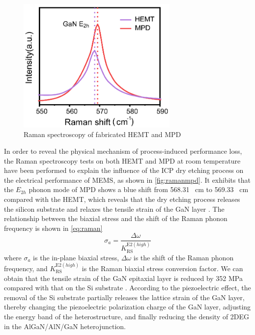 \begin{figure}[H] 
\centering    
\includegraphics[width=0.7\textwidth]{ramanmpd}
\caption[Raman spectroscopy of fabricated HEMT and MPD]{Raman spectroscopy of fabricated HEMT and MPD}
\label{fig:ramanmpd}
\end{figure}

In order to reveal the physical mechanism  of process-induced performance loss, the Raman spectroscopy tests on both HEMT  and MPD  at room temperature have been performed to explain the influence of the ICP dry etching  process on the electrical performance of MEMS, as shown in \autoref{fig:ramanmpd}. It exhibits that the $E_{2h}$ phonon mode of MPD shows a blue shift from 568.31 \unit{\per\cm} to 569.33 \unit{\per\cm} compared with the HEMT, which reveals that the dry etching process releases the silicon substrate and relaxes the tensile strain of the GaN layer \cite{yang2015influence,wang2016piezotronic}. The relationship between the biaxial stress  and the shift of the Raman phonon frequency is shown in \autoref{eq:raman} 
\begin{equation}
\sigma _{a}=\frac{\Delta \omega}{K_{\mathrm{RS}}^{\mathrm{E} 2(h i g h)}}
\label{eq:raman}
\end{equation}
where $\sigma _{a}$ is the  in-plane biaxial stress, $\Delta \omega$ is the shift of the Raman  phonon frequency, and $K_{\mathrm{RS}}^{\mathrm{E} 2(h i g h)}$ is the Raman biaxial stress conversion  factor. We can obtain that the tensile strain of the GaN epitaxial layer  is reduced by 352 \unit{\MPa} compared with that on the Si  substrate \cite{choi2013analysis}. According to the  piezoelectric effect, the removal of the Si substrate partially releases the lattice  strain of the GaN layer, thereby changing the piezoelectric polarization charge  of the GaN layer, adjusting the energy band  of the heterostructure, and finally reducing the density of 2DEG  in the  AlGaN/AlN/GaN heterojunction.

